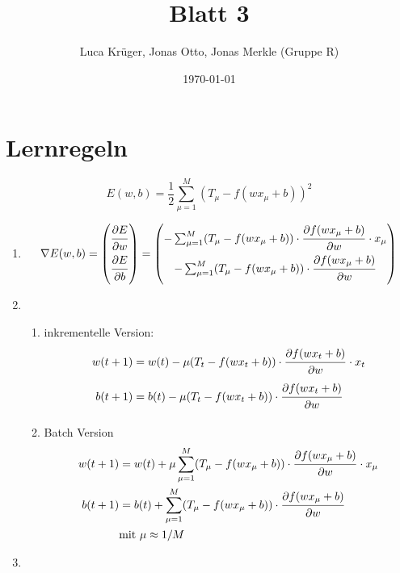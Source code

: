 \documentclass{article}
\title{Blatt 3}
\author{Luca Krüger, Jonas Otto, Jonas Merkle (Gruppe R)}
\date{\today}
\begin{document}
\maketitle

\section{Lernregeln}
$$E(w,b)=\frac{1}{2}\sum_{\mu=1}^{M}(T_{\mu}-f(wx_{\mu}+b))^2$$
\begin{enumerate}
  \item
        \begin{align*}
          \nabla E(w,b)=\begin{pmatrix} \dfrac{\strut \partial E}{\strut \partial w} \\ \dfrac{\strut \partial E}{\strut \partial b}\end{pmatrix} = \begin{pmatrix}
            - \sum_{\mu=1}^{M}(T_{\mu}-f(wx_{\mu}+b)) \cdot \dfrac{\strut \partial f(wx_{\mu}+b)}{\strut \partial w}\cdot x_{\mu} \\
            - \sum_{\mu=1}^{M}(T_{\mu}-f(wx_{\mu}+b)) \cdot \dfrac{\strut \partial f(wx_{\mu}+b)}{\strut \partial w}\end{pmatrix} \\
        \end{align*}
  \item
        \begin{enumerate}[label=\alph*)]
          \item inkrementelle Version:
                \begin{align*}
                  w(t+1) & =w(t)-\mu(T_{t}-f(wx_{t}+b)) \cdot \dfrac{\strut \partial f(wx_{t}+b)}{\strut \partial w}\cdot x_t \\
                  b(t+1) & =b(t)-\mu(T_{t}-f(wx_{t}+b)) \cdot \dfrac{\strut \partial f(wx_{t}+b)}{\strut \partial w}
                \end{align*}
          \item Batch Version
                \begin{align*}
                  w(t+1) & =w(t)+\mu\sum_{\mu=1}^{M}(T_{\mu}-f(wx_{\mu}+b)) \cdot \dfrac{\strut \partial f(wx_{\mu}+b)}{\strut \partial w}\cdot x_{\mu} \\
                  b(t+1) & =b(t)+\sum_{\mu=1}^{M}(T_{\mu}-f(wx_{\mu}+b)) \cdot \dfrac{\strut \partial f(wx_{\mu}+b)}{\strut \partial w}                 \\
                         & \text{mit}\ \mu \approx 1/M
                \end{align*}
        \end{enumerate}
  \item
\end{enumerate}
\end{document}
